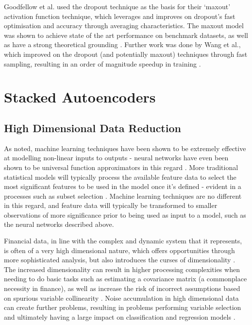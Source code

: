 \documentclass[a4paper,latin]{paper}
\begin{document}
Goodfellow et al. used the dropout technique as the basis for their ‘maxout’ activation function technique, which 
leverages and improves on dropout’s fast optimisation and accuracy through averaging characteristics. The 
maxout model was shown to achieve state of the art performance on benchmark datasets, as well as have a 
strong theoretical grounding \cite{Goodfellow}. Further work was done by Wang et al., which improved on the dropout 
(and potentially maxout) techniques through fast sampling, resulting in an order of magnitude speedup in
training \cite{Wang2}.
\hfill \break 










\section{Stacked Autoencoders}

\subsection{High Dimensional Data Reduction}\label{HDDR}

As noted, machine learning techniques have been shown to be extremely effective at modelling non-linear inputs 
to outputs - neural networks have even been shown to be universal function approximators in this regard \cite{Hornik}. 
More traditional statistical models will typically process the available feature data to select the most significant 
features to be used in the model once it’s defined - evident in a processes such as subset selection \cite{Schaefer}. 
Machine learning techniques are no different in this regard, and feature data will typically be transformed to smaller 
observations of more significance prior to being used as input to a model, such as the neural networks described above.
\hfill \break 

Financial data, in line with the complex and dynamic system that it represents, is often of a very high dimensional 
nature, which offers opportunities through more sophisticated analysis, but also introduces the curses of
 dimensionality \cite{Donoho}. The increased dimensionality can result in higher processing complexities when needing to 
 do basic tasks such as estimating a covariance matrix (a commonplace necessity in finance), as well as increase 
 the risk of incorrect assumptions based on spurious variable collinearity \cite{Fan1}. Noise accumulation in high 
 dimensional data can create further problems, resulting in problems performing variable selection and ultimately 
 having a large impact on classification and regression models \cite{Fan2}.
\hfill \break 
\end{document}
